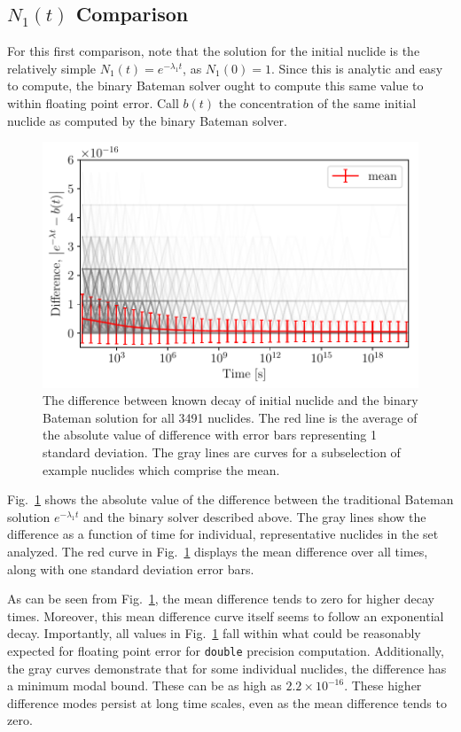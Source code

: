 \documentclass[letterpaper]{physor2018}
\begin{document}
\subsection{$N_1(t)$ Comparison}
\label{subsec-n1}
For this first comparison, note that the solution for the initial nuclide is
the relatively simple $N_1(t) = e^{-\lambda_1 t}$, as $N_1(0) = 1$. Since this is analytic and
easy to compute, the binary Bateman solver ought to compute this same
value to within floating point error.  Call $b(t)$ the concentration of the
same initial nuclide as computed by the binary Bateman solver.

\begin{figure}[!htb]
  \centering
  \includegraphics[scale=0.80]{./n1-diff.pdf}
  \caption{The difference between known decay of initial nuclide and the
           binary Bateman solution for all 3491 nuclides. The red line
           is the average of the absolute value of difference with
           error bars representing 1 standard deviation. The gray lines
           are curves for a subselection of example nuclides which comprise
           the mean.}
  \label{fig-n1}
\end{figure}

Fig.~\ref{fig-n1} shows the absolute value of the difference between
the traditional Bateman solution $e^{-\lambda_1 t}$ and the binary
solver described above. The gray lines show the difference as a function
of time for individual, representative nuclides in the set analyzed.
The red curve in Fig.~\ref{fig-n1} displays the mean difference over all
times, along with one standard deviation error bars.

As can be seen from Fig.~\ref{fig-n1}, the mean difference tends to zero for
higher decay times.  Moreover, this mean difference curve itself seems to
follow an exponential decay. Importantly, all values in Fig.~\ref{fig-n1}
fall within what could be reasonably expected for floating point error for
\texttt{double} precision computation. Additionally, the gray curves
demonstrate that for some individual nuclides, the difference has a minimum
modal bound. These can be as high as $2.2\times 10^{-16}$. These higher
difference modes persist at long time scales, even as the mean difference
tends to zero.
\end{document}
